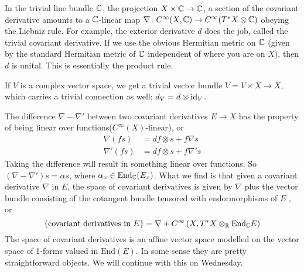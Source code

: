 \begin{example}
In the trivial line bundle $\mathbb{C}$, the projection $X \times \mathbb{C} \to \mathbb{C}$, a section of the covariant derivative amounts to a $\mathbb{C}$-linear map $\nabla \colon C ^{\infty} (X,\mathbb{C})\to C ^{\infty}(T ^* X \otimes \mathbb{C})$ obeying the Liebniz rule. For example, the exterior derivative $d$ does the job, called the trivial covariant derivative. If we use the obvious Hermitian metric on $\mathbb{C}$ (given by the standard Hermitian metric of $\mathbb{C}$ independent of where you are on $X$), then $d$ is unital. This is essentially the product rule. 
    

    If $V$ is a complex vector space, we get a trivial vector bundle $V = V \times X \to X$, which carries a trivial connection as well; $d_V = d \otimes \operatorname{id} _V$.
\end{example}
The difference $\nabla - \nabla '$ between two covariant derivatives $E \to X$ has the property of being linear over functions($C ^{\infty}(X)$-linear), or 
\begin{align*}
    \nabla (fs ) &= df \otimes s  + f \nabla s\\
    \nabla' (fs ) &= df \otimes s  + f \nabla' s 
\end{align*} Taking the difference will result in something linear over functions. So $(\nabla-  \nabla')s = \alpha s$, where $\alpha _x \in \mathrm{End}_{\mathbb{C}}(E_x)$. What we find is that given a covariant derivative $\nabla$ in $E$, the space of covariant derivatives is given by $\nabla$ plus the vector bundle consisting of the cotangent bundle tensored with endormorphisms of $E$
, or \[
    \{ \text{covariant derivatives in } E\} = \nabla + C ^{\infty}\left(X, T^*X\otimes _{\mathbb{R}}\mathrm{End}_{\mathbb{C}}E\right)
\] The space of covariant derivatives is an affine vector space modelled on the vector space of 1-forms valued in $\mathrm{End}(E)$. In some sense they are pretty straightforward objects. We will continue with this on Wednesday.
